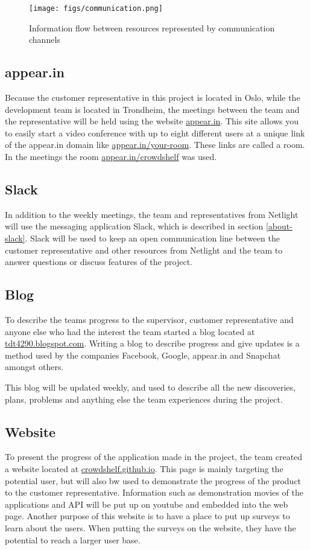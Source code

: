 \begin{figure}
\centering
\texttt{[image: figs/communication.png]}
\caption{Information flow between resources represented by communication channels}
\label{fig:communication-flow}
\end{figure}



\subsection{appear.in}
Because the customer representative in this project is located in Oslo, while the development team is located in Trondheim, the meetings between the team and the representative will be held using the website \url{appear.in}.\cite{appear-in} This site allows you to easily start a video conference with up to eight different users at a unique link of the appear.in domain like \url{appear.in/your-room}. These links are called a room. In the meetings the room \url{appear.in/crowdshelf} was used.

\subsection{Slack}
In addition to the weekly meetings, the team and representatives from Netlight will use the messaging application Slack, which is described in section \ref{about-slack}.\cite{slack} Slack will be used to keep an open communication line between the customer representative and other resources from Netlight and the team to answer questions or discuss features of the project.

\subsection{Blog}
To describe the teams progress to the supervisor, customer representative and anyone else who had the interest the team started a blog located at \url{tdt4290.blogspot.com}. Writing a blog to describe progress and give updates is a method used by the companies
 Facebook, Google, appear.in and Snapchat amongst others.\cite{facebook-blog}\cite{google-blog}\cite{appear-in-blog}\cite{snapchat-blog}

This blog will be updated weekly, and used to describe all the new discoveries, plans, problems and anything else the team experiences during the project. 

\subsection{Website}
To present the progress of the application made in the project, the team created a website located at \url{crowdshelf.github.io}. This page is mainly targeting the potential user, but will also bw used to demonstrate the progress of the product to the customer representative.  Information such as demonstration movies of the applications and API will be put up on youtube and embedded into the web page. 
Another purpose of this website is to have a place to put up surveys to learn about the users. When putting the surveys on the website, they have the potential to reach a larger user base.

